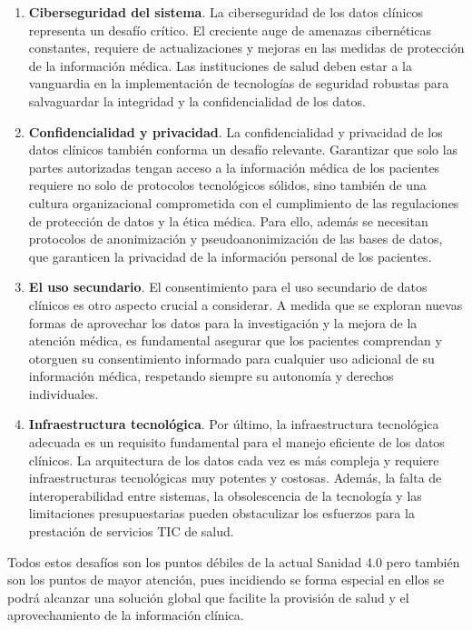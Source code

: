 \begin{enumerate}[label=\roman*.]
    \item \textbf{Ciberseguridad del sistema}. La ciberseguridad de los datos clínicos representa un desafío crítico. El creciente auge de amenazas cibernéticas constantes, requiere de actualizaciones y mejoras en las medidas de protección de la información médica. Las instituciones de salud deben estar a la vanguardia en la implementación de tecnologías de seguridad robustas para salvaguardar la integridad y la confidencialidad de los datos.
    \item \textbf{Confidencialidad y privacidad}.   La confidencialidad y privacidad de los datos clínicos también conforma un desafío relevante. Garantizar que solo las partes autorizadas tengan acceso a la información médica de los pacientes requiere no solo de protocolos tecnológicos sólidos, sino también de una cultura organizacional comprometida con el cumplimiento de las regulaciones de protección de datos y la ética médica. Para ello, además se necesitan protocolos de anonimización y pseudoanonimización de las bases de datos, que garanticen la privacidad de la información personal de los pacientes.
    \item \textbf{El uso secundario}. El consentimiento para el uso secundario de datos clínicos es otro aspecto crucial a considerar. A medida que se exploran nuevas formas de aprovechar los datos para la investigación y la mejora de la atención médica, es fundamental asegurar que los pacientes comprendan y otorguen su consentimiento informado para cualquier uso adicional de su información médica, respetando siempre su autonomía y derechos individuales.
    \item \textbf{Infraestructura tecnológica}. Por último, la infraestructura tecnológica adecuada es un requisito fundamental para el manejo eficiente de los datos clínicos. La arquitectura de los datos cada vez es más compleja y requiere infraestructuras tecnológicas muy potentes y costosas. Además, la falta de interoperabilidad entre sistemas, la obsolescencia de la tecnología y las limitaciones presupuestarias pueden obstaculizar los esfuerzos para la prestación de servicios TIC de salud.
    
\end{enumerate}

Todos estos desafíos son los puntos débiles de la actual Sanidad 4.0 pero también son los puntos de mayor atención, pues incidiendo se forma especial en ellos se podrá alcanzar una solución global que facilite la provisión de salud y el aprovechamiento de la información clínica.

